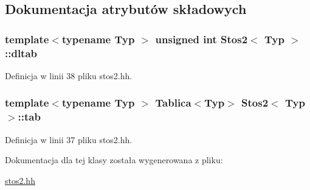 \subsection{Dokumentacja atrybutów składowych}
\hypertarget{class_stos2_ad485021174de06d5faedba7cad9cbaa2}{
\subsubsection[{dltab}]{\setlength{\rightskip}{0pt plus 5cm}template$<$typename Typ $>$ unsigned int {\bf Stos2}$<$ Typ $>$\-::dltab\hspace{0.3cm}{\ttfamily [private]}}}\label{class_stos2_ad485021174de06d5faedba7cad9cbaa2}


Definicja w linii 38 pliku stos2.\-hh.

\hypertarget{class_stos2_a9c7f4132f7a4302226d62fd816ed10ed}{
\subsubsection[{tab}]{\setlength{\rightskip}{0pt plus 5cm}template$<$typename Typ $>$ {\bf Tablica}$<$Typ$>$ {\bf Stos2}$<$ Typ $>$\-::tab\hspace{0.3cm}{\ttfamily [private]}}}\label{class_stos2_a9c7f4132f7a4302226d62fd816ed10ed}


Definicja w linii 37 pliku stos2.\-hh.



Dokumentacja dla tej klasy została wygenerowana z pliku\-:\begin{DoxyCompactItemize}
\item 
\hyperlink{stos2_8hh}{stos2.\-hh}\end{DoxyCompactItemize}
